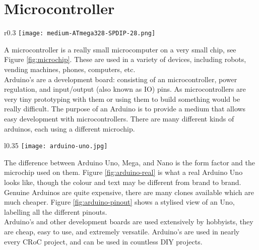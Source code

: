 \documentclass[../TinyBot.tex]{subfiles}
\begin{document}
\section{Microcontroller} \label{sec:microcontroller}
\begin{wrapfigure}[4]{r}{0.3\textwidth}
    \vspace{-1cm}
    \texttt{[image: medium-ATmega328-SPDIP-28.png]}
    \label{fig:microchip}
\end{wrapfigure}

A microcontroller is a really small microcomputer on a very small chip, see Figure \ref{fig:microchip}.
These are used in a variety of devices, including robots, vending machines, phones, computers, etc. \\

Arduino's are a development board: consisting of an microcontroller, power regulation, and input/output (also known as IO) pins.
As microcontrollers are very tiny prototyping with them or using them to build something would be really difficult.
The purpose of an Arduino is to provide a medium that allows easy development with microcontrollers.
There are many different kinds of arduinos, each using a different microchip. \\

\begin{wrapfigure}[10]{l}{0.35\textwidth}
    \centering
    \vspace{-0.5cm}
    \texttt{[image: arduino-uno.jpg]}
    \caption{An Arduino Uno}
    \label{fig:arduino-real}
\end{wrapfigure}


The difference between Arduino Uno, Mega, and Nano is the form factor and the microchip used on them. 
Figure \ref{fig:arduino-real} is what a real Arduino Uno looks like, though the colour and text may
be different from brand to brand. Genuine Arduinos are quite expensive, there are many clones available which are much cheaper. Figure \ref{fig:arduino-pinout} shows a stylised view of an Uno, labelling all the different pinouts. \\

Arduino's and other development boards are used extensively by hobbyists, they are cheap, easy to use, and extremely versatile.
Arduino's are used in nearly every CRoC project, and can be used in countless DIY projects. \\
\end{document}
